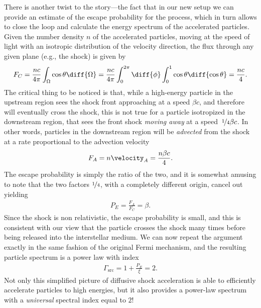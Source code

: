 There is another twist to the story---the fact that in our new setup we can provide
an estimate of the escape probability for the process, which in turn allows to close
the loop and calculate the energy spectrum of the accelerated particles.
Given the number density $n$ of the accelerated particles, moving at the speed of
light with an isotropic distribution of the velocity direction, the flux through
any given plane (e.g., the shock) is given by
\begin{align*}
  F_C = \frac{nc}{4\pi}\int_\Omega \cos\theta \diff{\Omega} =
  \frac{nc}{4\pi}\int_0^{2\pi}\diff{\phi}\int_0^{1} \cos\theta \diff{\cos\theta} =
  \frac{nc}{4}.
\end{align*}
The critical thing to be noticed is that, while a high-energy particle in the
upstream region sees the shock front approaching at a speed $\beta c$, and therefore
will eventually cross the shock, this is not true for a particle isotropized in
the downstream region, that sees the front shock \emph{moving away} at a
speed~$\nicefrac{1}{4} \beta c$. In other words, particles in the downstream region
will be \emph{advected} from the shock at a rate proportional to the advection
velocity
\begin{align*}
  F_A = n\velocity_A = \frac{n\beta c}{4}.
\end{align*}
The escape probability is simply the ratio of the two, and it is somewhat amusing
to note that the two factors $\nicefrac{1}{4}$, with a completely different origin,
cancel out yielding
\begin{align}
  P_E = \frac{F_A}{F_C} = \beta.
\end{align}
Since the shock is non relativistic, the escape probability is small, and this
is consistent with our view that the particle crosses the shock many times before
being released into the interstellar medium. We can now repeat the argument
exactly in the same fashion of the original Fermi mechanism, and the resulting
particle spectrum is a power law with index
\begin{align}
  \Gamma_\text{src} = 1 + \frac{P_E}{\xi} = 2.
\end{align}
Not only this simplified picture of diffusive shock acceleration is able to efficiently
accelerate particles to high energies, but it also provides a power-law spectrum
with a \emph{universal} spectral index equal to $2$!


